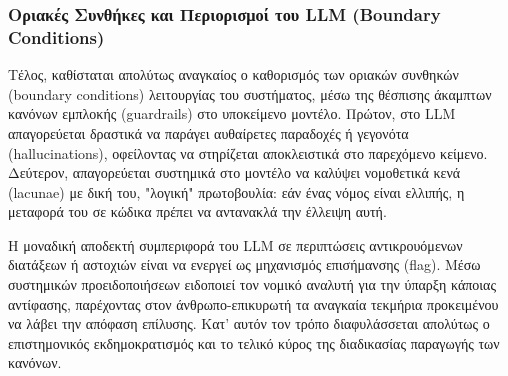 \subsubsection{Οριακές Συνθήκες και Περιορισμοί του LLM (Boundary Conditions)}
Τέλος, καθίσταται απολύτως αναγκαίος ο καθορισμός των οριακών συνθηκών (boundary conditions) λειτουργίας του συστήματος, μέσω της θέσπισης άκαμπτων κανόνων εμπλοκής (guardrails) στο υποκείμενο μοντέλο. Πρώτον, στο LLM απαγορεύεται δραστικά να παράγει αυθαίρετες παραδοχές ή γεγονότα (hallucinations), οφείλοντας να στηρίζεται αποκλειστικά στο παρεχόμενο κείμενο. Δεύτερον, απαγορεύεται συστημικά στο μοντέλο να καλύψει νομοθετικά κενά (lacunae) με δική του, "λογική" πρωτοβουλία: εάν ένας νόμος είναι ελλιπής, η μεταφορά του σε κώδικα πρέπει να αντανακλά την έλλειψη αυτή. 

Η μοναδική αποδεκτή συμπεριφορά του LLM σε περιπτώσεις αντικρουόμενων διατάξεων ή αστοχιών είναι να ενεργεί ως μηχανισμός επισήμανσης (flag). Μέσω συστημικών προειδοποιήσεων ειδοποιεί τον νομικό αναλυτή για την ύπαρξη κάποιας αντίφασης, παρέχοντας στον άνθρωπο-επικυρωτή τα αναγκαία τεκμήρια προκειμένου να λάβει την απόφαση επίλυσης. Κατ' αυτόν τον τρόπο διαφυλάσσεται απολύτως ο επιστημονικός εκδημοκρατισμός και το τελικό κύρος της διαδικασίας παραγωγής των κανόνων.

